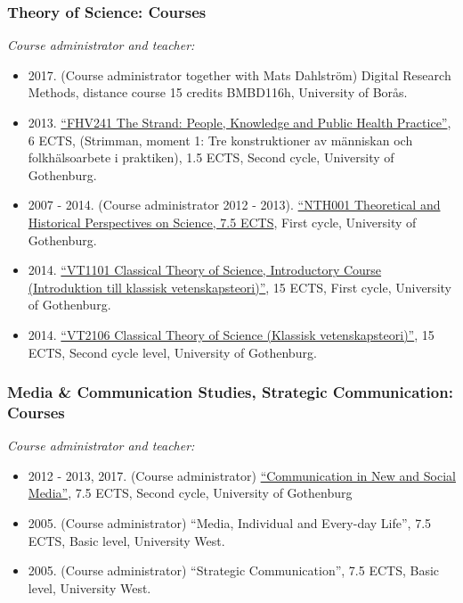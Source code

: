 \documentclass[a4paper,11pt,oneside]{article}
\begin{document}
        \subsubsection{Theory of Science: Courses}
        \noindent \emph{Course administrator and teacher:}
        \begin{itemize}
          \item 2017. (Course administrator together with Mats Dahlström) Digital Research Methods, distance course 15 credits BMBD116h, University of Borås.
          \item 2013. \href{http://files.christopherkullenberg.se/kursplaner/FHV241Strimman.pdf}{``FHV241 The Strand: People, Knowledge and Public Health Practice''}, 6 ECTS, (Strimman, moment 1: Tre konstruktioner av människan och folkhälsoarbete i praktiken), 1.5 ECTS, Second cycle, University of Gothenburg.
          \item 2007 - 2014. (Course administrator 2012 - 2013). \href{http://files.christopherkullenberg.se/kursplaner/NTH001_Teoretiska_och_historiska_perspektiv_pa%cc%8a_naturvetenskap_10512.pdf}{``NTH001 Theoretical and Historical Perspectives on Science, 7.5 ECTS}, First cycle, University of Gothenburg.
          \item 2014. \href{http://files.christopherkullenberg.se/kursplaner/VT1101_Introduktion_i_klassisk_vetenskapsteori__grundkurs_13185.pdf}{``VT1101 Classical Theory of Science, Introductory Course (Introduktion till klassisk vetenskapsteori)''}, 15 ECTS, First cycle, University of Gothenburg.
          \item 2014. \href{http://files.christopherkullenberg.se/kursplaner/VT2106_Klassisk_vetenskapsteori_13187.pdf}{``VT2106 Classical Theory of Science (Klassisk vetenskapsteori)''}, 15 ECTS, Second cycle level, University of Gothenburg.
        \end{itemize}

        \subsubsection{Media \& Communication Studies, Strategic Communication: Courses}
             \noindent \emph{Course administrator and teacher:}
             \begin{itemize}
               \item 2012 - 2013, 2017. (Course administrator) \href{http://files.christopherkullenberg.se/kursplaner/KT2102.pdf}{``Communication in New and Social Media''}, 7.5 ECTS, Second cycle, University of Gothenburg
               \item 2005. (Course administrator) ``Media, Individual and Every-day Life'', 7.5 ECTS, Basic level, University West.
               \item 2005. (Course administrator) ``Strategic Communication'', 7.5 ECTS, Basic level, University West.
             \end{itemize}
\end{document}
